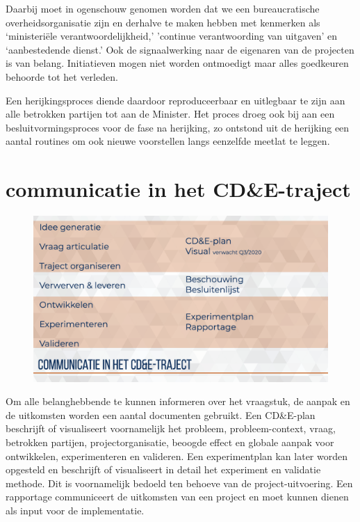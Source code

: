 \documentclass[
]{book}
\begin{document}
Daarbij moet in ogenschouw genomen worden dat we een bureaucratische overheidsorganisatie zijn en derhalve te maken hebben met kenmerken als `ministeriële verantwoordelijkheid,' 'continue verantwoording van uitgaven' en `aanbestedende dienst.' Ook de signaalwerking naar de eigenaren van de projecten is van belang. Initiatieven mogen niet worden ontmoedigt maar alles goedkeuren behoorde tot het verleden.

Een herijkingsproces diende daardoor reproduceerbaar en uitlegbaar te zijn aan alle betrokken partijen tot aan de Minister. Het proces droeg ook bij aan een besluitvormingsproces voor de fase na herijking, zo ontstond uit de herijking een aantal routines om ook nieuwe voorstellen langs eenzelfde meetlat te leggen.

\hypertarget{communicatie-in-het-cde-traject}{%
\section{communicatie in het CD\&E-traject}\label{communicatie-in-het-cde-traject}}

\begin{figure}
\includegraphics[width=26.67in]{data/keynote-slides/20200430-CDE-Designprocess/20200430-CDE-Designprocess.035} \caption{ }\label{fig:unnamed-chunk-23}
\end{figure}

Om alle belanghebbende te kunnen informeren over het vraagstuk, de aanpak en de uitkomsten worden een aantal documenten gebruikt.
Een CD\&E-plan beschrijft of visualiseert voornamelijk het probleem, probleem-context, vraag, betrokken partijen, projectorganisatie, beoogde effect en globale aanpak voor ontwikkelen, experimenteren en valideren.
Een experimentplan kan later worden opgesteld en beschrijft of visualiseert in detail het experiment en validatie methode. Dit is voornamelijk bedoeld ten behoeve van de project-uitvoering.
Een rapportage communiceert de uitkomsten van een project en moet kunnen dienen als input voor de implementatie.
\end{document}
